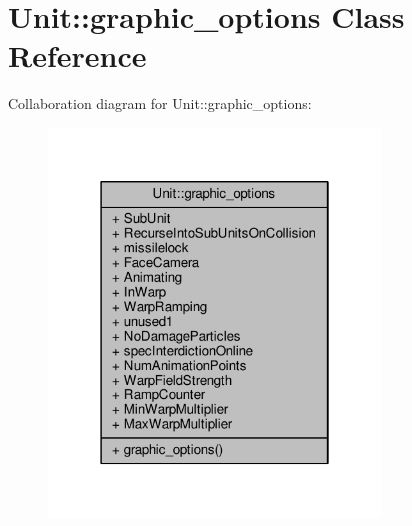\hypertarget{classUnit_1_1graphic__options}{}\section{Unit\+:\+:graphic\+\_\+options Class Reference}
\label{classUnit_1_1graphic__options}


Collaboration diagram for Unit\+:\+:graphic\+\_\+options\+:
\nopagebreak
\begin{figure}[H]
\begin{center}
\leavevmode
\includegraphics[width=250pt]{d7/d07/classUnit_1_1graphic__options__coll__graph}
\end{center}
\end{figure}
